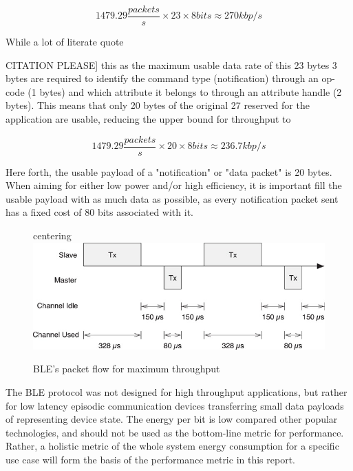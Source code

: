 \documentclass[]{article}
\begin{document}
\begin{displaymath}
1479.29 \frac{packets}{s} \times 23 \times 8 bits \approx 270 kbp/s
\end{displaymath}

While a lot of literate quote{CITATION PLEASE] this as the maximum usable data rate of this 23 bytes 3 bytes are required to identify the command type (notification) through an op-code (1 bytes) and which attribute it belongs to through an attribute handle (2 bytes). This means that only 20 bytes of the original 27 reserved for the application are usable, reducing the upper bound for throughput to 

\begin{displaymath}
1479.29 \frac{packets}{s} \times 20 \times 8 bits \approx 236.7 kbp/s
\end{displaymath}

Here forth, the usable payload of a "notification" or "data packet" is 20 bytes. When aiming for either low power and/or high efficiency, it is important fill the usable payload with as much data as possible, as every notification packet sent has a fixed cost of 80 bits associated with it.  

\begin{figure}[h]
	centering
		\includegraphics[width = 1\textwidth]{turnaround}
	\caption{\ac{BLE}'s packet flow for maximum throughput}
	\label{fig:turnaround}
\end{figure}

The \ac{BLE} protocol was not designed for high throughput applications, but rather for low latency episodic communication devices transferring small data payloads of representing device state. The energy per bit is low compared other popular technologies, and should not be used as the bottom-line metric for performance. Rather, a holistic metric of the whole system energy consumption for a specific use case will form the basis of the performance metric in this report.








}
\end{document}
